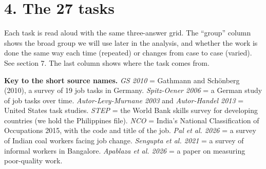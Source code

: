 \documentclass[11pt]{article}
\begin{document}
\section*{4. The 27 tasks}

Each task is read aloud with the same three-answer grid. The ``group'' column shows the broad group
we will use later in the analysis, and whether the work is done the same way each time (repeated) or
changes from case to case (varied). See section 7. The last column shows where the task comes from.

\textbf{Key to the short source names.} \emph{GS 2010} = Gathmann and Sch\"onberg (2010), a survey of 19 job tasks in Germany.
\emph{Spitz-Oener 2006} = a German study of job tasks over time. \emph{Autor-Levy-Murnane 2003} and \emph{Autor-Handel 2013} = United States task studies.
\emph{STEP} = the World Bank skills survey for developing countries (we hold the Philippines file). \emph{NCO} = India's National Classification of Occupations 2015, with the code and title of the job.
\emph{Pal et al. 2026} = a survey of Indian coal workers facing job change. \emph{Sengupta et al. 2021} = a survey of informal workers in Bangalore.
\emph{Apablaza et al. 2026} = a paper on measuring poor-quality work.
\end{document}
